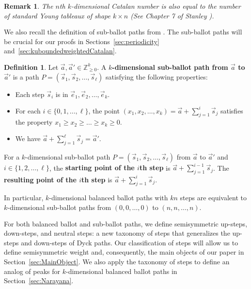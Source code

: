 \documentclass[11pt]{article}
\newtheorem{remark}[theorem]{Remark}
\theoremstyle{remark}
\theoremstyle{definition}
\newtheorem{definition}[theorem]{Definition}
\begin{document}
\begin{remark}
The $n$th $k$-dimensional Catalan number is also equal to the number of standard Young tableaux of shape $k \times n$ (See Chapter 7 of Stanley \cite{MR4621625}).
\end{remark}

We also recall the definition of sub-ballot paths from \cite{MR5034574}. The sub-ballot paths will be crucial for our proofs in Sections~\ref{sec:periodicity} and~\ref{sec:kuboundedweightedCatalan}.
\begin{definition}
\label{defn:k-dim-pathsubballot}
Let $\vec{a}, \vec{a}' \in \mathbb{Z}_{\geq 0}^{k}$. A \textbf{$k$-dimensional sub-ballot path from $\vec{a}$ to $\vec{a}'$} is a path $P =(\vec{s}_1, \vec{s}_2, \dots, \vec{s}_{\ell})$ satisfying the following properties:
\begin{itemize}
\item Each step $\vec{s}_i$ is in ${\vec{e}_1, \vec{e}_2, \dots, \vec{e}_k}$.
\item For each $i \in \{0,1, \dots, \ell\}$, the point $\displaystyle (x_1, x_2, \dots, x_k) = \vec{a}+\sum_{j=1}^i\vec{s}_j$ satisfies the property $x_1 \geq x_2 \geq \dots \geq x_k\geq 0$.
\item We have $\displaystyle \vec{a} + \sum_{j=1}^{\ell}\vec{s}_j = \vec{a}'$.
\end{itemize}
For a $k$-dimensional sub-ballot path $P = (\vec{s}_1, \vec{s}_2, \dots, \vec{s}_{\ell})$ from $\vec{a}$ to $\vec{a}'$ and $i \in \{1, 2, \dots, \ell\}$, the \textbf{starting point of the $i$th step} is $\vec{a} + \sum_{j=1}^{i-1}\vec{s}_j$. The \textbf{resulting point of the $i$th step} is $\vec{a} + \sum_{j=1}^{i}\vec{s}_j$.
\end{definition}
In particular, $k$-dimensional balanced ballot paths with $kn$ steps are equivalent to $k$-dimensional sub-ballot paths from $(0, 0, \dots, 0)$ to $(n, n, \dots, n)$.

For both balanced ballot and sub-ballot paths, we define semisymmetric up-steps, down-steps, and neutral steps: a new taxonomy of steps that generalizes the up-steps and down-steps of Dyck paths. Our classification of steps will allow us to define semisymmetric weight and, consequently, the main objects of our paper in Section~\ref{sec:MainObject}. We also apply the taxonomy of steps to define an analog of peaks for $k$-dimensional balanced ballot paths in Section~\ref{sec:Narayana}.
\end{document}
